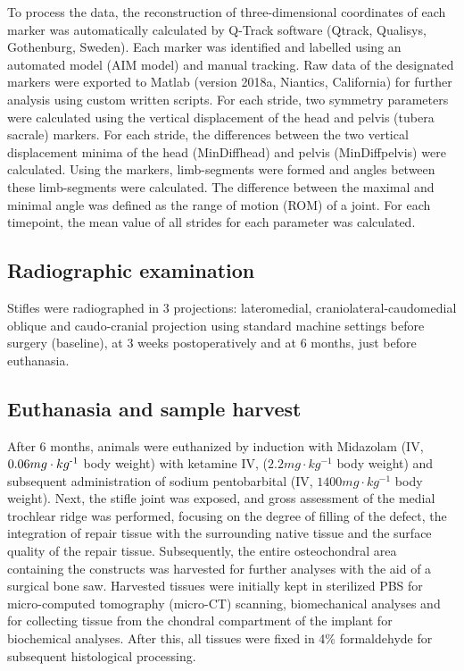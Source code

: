 \documentclass[twocolumn, empirical, authordate, issue]{jote-new-article}
\begin{document}
To process the data, the reconstruction of three-dimensional coordinates of each marker was automatically calculated by Q-Track software (Qtrack, Qualisys, Gothenburg, Sweden). Each marker was identified and labelled using an automated model (AIM model) and manual tracking. Raw data of the designated markers were exported to Matlab (version 2018a, Niantics, California) for further analysis using custom written scripts. For each stride, two symmetry parameters were calculated using the vertical displacement of the head and pelvis (tubera sacrale) markers. For each stride, the differences between the two vertical displacement minima of the head (MinDiffhead) and pelvis (MinDiffpelvis) were calculated. Using the markers, limb-segments were formed and angles between these limb-segments were calculated. The difference between the maximal and minimal angle was defined as the range of motion (ROM) of a joint. For each timepoint, the mean value of all strides for each parameter was calculated.





\subsection{Radiographic examination} 

Stifles were radiographed in 3 projections: lateromedial, craniolateral-caudomedial oblique and caudo-cranial projection using standard machine settings before surgery (baseline), at 3 weeks postoperatively and at 6 months, just before euthanasia.

\subsection{Euthanasia and sample harvest} 

After 6 months, animals were euthanized by induction with Midazolam (IV, $0.06mg\cdot kg\textsuperscript{-1}$ body weight) with ketamine IV, ($ 2.2 mg\cdot kg^{-1} $ body weight) and subsequent administration of sodium pentobarbital (IV, $ 1400 mg\cdot kg^{-1} $ body weight). Next, the stifle joint was exposed, and gross assessment of the medial trochlear ridge was performed, focusing on the degree of filling of the defect, the integration of repair tissue with the surrounding native tissue and the surface quality of the repair tissue. Subsequently, the entire osteochondral area containing the constructs was harvested for further analyses with the aid of a surgical bone saw. Harvested tissues were initially kept in sterilized PBS for micro-computed tomography (micro-CT) scanning, biomechanical analyses and for collecting tissue from the chondral compartment of the implant for biochemical analyses. After this, all tissues were fixed in 4\% formaldehyde for subsequent histological processing.
\end{document}
